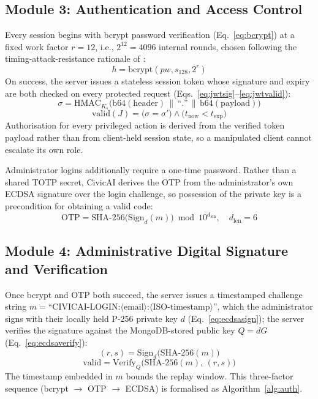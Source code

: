 \documentclass[conference]{IEEEtran}
\begin{document}
\subsection{Module 3: Authentication and Access Control}
\label{sec:module3}
Every session begins with bcrypt password verification (Eq.~\ref{eq:bcrypt}) at a fixed work factor $r=12$, i.e., $2^{12}=4096$ internal rounds, chosen following the timing-attack-resistance rationale of \cite{provos1999bcrypt}:
\begin{equation}
h = \mathrm{bcrypt}(pw, s_{128}, 2^{r})
\label{eq:bcrypt}
\end{equation}
On success, the server issues a stateless session token whose signature and expiry are both checked on every protected request (Eqs.~\ref{eq:jwtsig}--\ref{eq:jwtvalid}):
\begin{equation}
\sigma = \mathrm{HMAC}_{K_s}\big(\mathrm{b64}(\mathrm{header}) \,\|\, \text{``.''} \,\|\, \mathrm{b64}(\mathrm{payload})\big)
\label{eq:jwtsig}
\end{equation}
\begin{equation}
\mathrm{valid}(J) = \big(\sigma = \sigma'\big) \wedge \big(t_{\mathrm{now}} < t_{\mathrm{exp}}\big)
\label{eq:jwtvalid}
\end{equation}
Authorisation for every privileged action is derived from the verified token payload rather than from client-held session state, so a manipulated client cannot escalate its own role.

Administrator logins additionally require a one-time password. Rather than a shared TOTP secret, CivicAI derives the OTP from the administrator's own ECDSA signature over the login challenge, so possession of the private key is a precondition for obtaining a valid code:
\begin{equation}
\mathrm{OTP} = \mathrm{SHA\text{-}256}\big(\mathrm{Sign}_d(m)\big) \bmod 10^{d_{\mathrm{len}}}, \quad d_{\mathrm{len}} = 6
\label{eq:totp}
\end{equation}

\subsection{Module 4: Administrative Digital Signature and Verification}
Once bcrypt and OTP both succeed, the server issues a timestamped challenge string $m = \text{``CIVICAI-LOGIN:}\langle\text{email}\rangle\text{:}\langle\text{ISO-timestamp}\rangle\text{''}$, which the administrator signs with their locally held P-256 private key $d$ (Eq.~\ref{eq:ecdsasign}); the server verifies the signature against the MongoDB-stored public key $Q = dG$ (Eq.~\ref{eq:ecdsaverify}):
\begin{equation}
(r,s) = \mathrm{Sign}_{d}\big(\mathrm{SHA\text{-}256}(m)\big)
\label{eq:ecdsasign}
\end{equation}
\begin{equation}
\mathrm{valid} = \mathrm{Verify}_{Q}\big(\mathrm{SHA\text{-}256}(m),\,(r,s)\big)
\label{eq:ecdsaverify}
\end{equation}
The timestamp embedded in $m$ bounds the replay window. This three-factor sequence (bcrypt $\rightarrow$ OTP $\rightarrow$ ECDSA) is formalised as Algorithm~\ref{alg:auth}.
\end{document}
